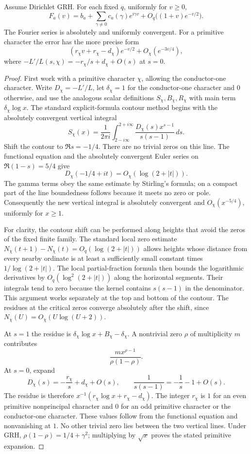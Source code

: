 \begin{lemma}\label{lem:app-ramp}
Assume Dirichlet GRH.  For each fixed $q$, uniformly for $v\ge0$,
\begin{equation}\label{eq:app-ramp-expansion}
 F_a(v)=b_a+\sum_{\gamma\ne0}c_a(\gamma)e^{i\gamma v}
                 +O_q\bigl((1+v)e^{-v/2}\bigr).
\end{equation}
The Fourier series is absolutely and uniformly convergent.  For a primitive
character the error has the more precise form
\[
 (r_\chi v+r_\chi-d_\chi)e^{-v/2}+O_\chi(e^{-3v/4}),
\]
where $-L'/L(s,\chi)=-r_\chi/s+d_\chi+O(s)$ at $s=0$.
\end{lemma}

\begin{proof}
First work with a primitive character $\chi$, allowing the conductor-one
character.  Write $D_\chi=-L'/L$, let $\delta_\chi=1$ for the
conductor-one character and $0$ otherwise, and use the analogous scalar
definitions $S_\chi,B_\chi,R_\chi$ with main term
$\delta_\chi\log x$.  The standard explicit-formula contour method \cite{Davenport} begins with the absolutely convergent
vertical integral
\[
 S_\chi(x)=\frac1{2\pi i}\int_{2-i\infty}^{2+i\infty}
       \frac{D_\chi(s)x^{s-1}}{s(s-1)}\,ds.
\]
Shift the contour to $\Re s=-1/4$.  There are no trivial zeros on this
line.  The functional equation and the absolutely convergent Euler series
on $\Re(1-s)=5/4$ give
\[
 D_\chi(-1/4+it)=O_\chi(\log(2+|t|)).
\]
The gamma terms obey the same estimate by Stirling's formula; on a compact
part of the line boundedness follows because it meets no zero or pole.
Consequently the new vertical integral is absolutely convergent and
$O_\chi(x^{-5/4})$, uniformly for $x\ge1$.

For clarity, the contour shift can be performed along heights that avoid
the zeros of the fixed finite family.  The standard local zero estimate
$N_\chi(t+1)-N_\chi(t)=O_q(\log(2+|t|))$ allows heights whose distance
from every nearby ordinate is at least a sufficiently small constant times
$1/\log(2+|t|)$.  The local partial-fraction formula then bounds the
logarithmic derivatives by $O_q(\log^2(2+|t|))$ along the horizontal
segments.  Their integrals tend to zero because the kernel contains
$s(s-1)$ in the denominator.  This argument works separately at the top
and bottom of the contour.  The residues at the critical zeros converge
absolutely after the shift, since
$N_\chi(U)=O_\chi(U\log(U+2))$.

At $s=1$ the residue is
$\delta_\chi\log x+B_\chi-\delta_\chi$.  A nontrivial zero $\rho$
of multiplicity $m$ contributes
\[
 \frac{m x^{\rho-1}}{\rho(1-\rho)}.
\]
At $s=0$, expand
\[
 D_\chi(s)=-\frac{r_\chi}{s}+d_\chi+O(s),\qquad
 \frac1{s(s-1)}=-\frac1s-1+O(s).
\]
The residue is therefore
$x^{-1}(r_\chi\log x+r_\chi-d_\chi)$.
The integer $r_\chi$ is $1$ for an even primitive nonprincipal character
and $0$ for an odd primitive character or the conductor-one character.
These values follow from the functional equation and nonvanishing at $1$.
No other trivial zero lies between the two vertical lines.  Under GRH,
$\rho(1-\rho)=1/4+\gamma^2$; multiplying by $\sqrt x$ proves the stated
primitive expansion.


\end{proof}

